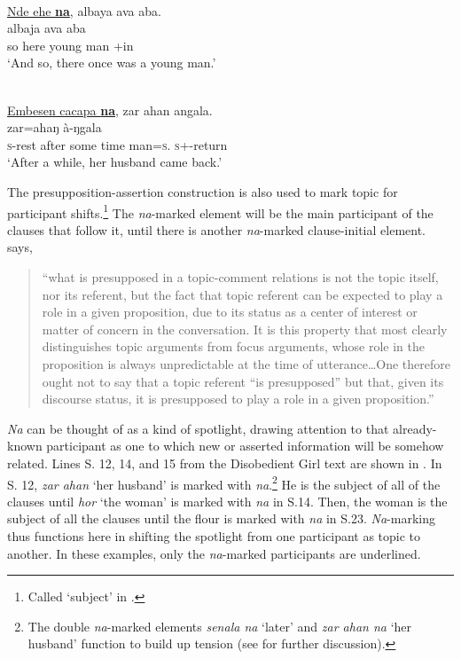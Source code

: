 \ea \label{ex:11:34}
\\
\underline{Nde  ehe  \textbf{na}},  albaya  ava  aba. \\  
\gll  {}         albaja           ava    aba\\
      so     here   {\PSP}   {young man}  {\EXT}+in   {\EXT}  \\
\glt  ‘And so, there once was a young  man.’ 
\z

\ea \label{ex:11:35}
\\
\underline{Embesen  cacapa  \textbf{na}}, zar  ahan  angala.\\
\gll  {}        zar=ahaŋ       à-ŋgala\\
      \textsc{s}-rest  {after some time}   {\PSP}   man=\textsc{s}.{\POSS}  \textsc{s}+{\PFV}-return\\
\glt  ‘After a while, her husband came back.’ 
\z

The presupposition-assertion construction is also used to mark topic for participant shifts.\footnote{Called ‘subject’ in \citet{Chafe1976}.} The \textit{na}{}-marked element will be the main participant of the clauses that follow it, until there is another \textit{na}{}-marked clause-initial element. \citet[151]{Lambrecht1994} says,  

\begin{quote}
“what is presupposed in a topic-comment relations is not the topic itself, nor its referent, but the fact that topic referent can be expected to play a role in a given proposition, due to its status as a center of interest or matter of concern in the conversation. It is this property that most clearly distinguishes topic arguments from focus arguments, whose role in the proposition is always unpredictable at the time of utterance…One therefore ought not to say that a topic referent “is presupposed” but that, given its discourse status, it is presupposed to play a role in a given proposition.” 
\end{quote}

\textit{Na} can be thought of as a kind of spotlight, drawing attention to that already-known participant as one to which new or asserted information will be somehow related. Lines S. 12, 14, and 15 from the Disobedient Girl text are shown in . In S. 12, \textit{zar ahan} ‘her husband’ is marked with \textit{na}.\footnote{The double \textit{na}{}-marked elements \textit{senala na} ‘later’ and \textit{zar ahan na} ‘her husband’ function to build up tension (see  for further discussion).} He is the subject of all of the clauses until \textit{hor} ‘the woman’ is marked with \textit{na} in S.14. Then, the woman is the subject of all the clauses until the flour is marked with \textit{na} in S.23. \textit{Na}{}-marking thus functions here in shifting the spotlight from one participant as topic to another. In these examples, only the \textit{na}{}-marked participants are underlined. 

